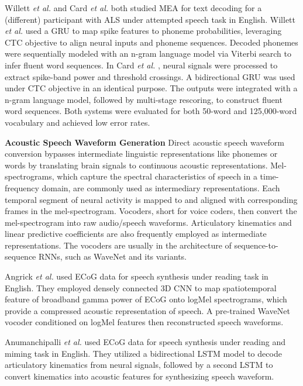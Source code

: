 \documentclass[journal]{IEEEtran}
\begin{document}
Willett \emph{et al.} \cite{Willett2023} and Card \emph{et al.} \cite{Card2024} both studied MEA for text decoding for a (different) participant with ALS under attempted speech task in English. Willett \emph{et al.} \cite{Willett2023} used a GRU to map spike features to phoneme probabilities, leveraging CTC objective to align neural inputs and phoneme sequences. Decoded phonemes were sequentially modeled with an n-gram language model via Viterbi search to infer fluent word sequences. In Card \emph{et al.} \cite{Card2024}, neural signals were processed to extract spike-band power and threshold crossings. A bidirectional GRU was used under CTC objective in an identical purpose. The outputs were integrated with a n-gram language model, followed by multi-stage rescoring, to construct fluent word sequences. Both systems were evaluated for both 50-word and 125,000-word vocabulary and achieved low error rates.

\textbf{Acoustic Speech Waveform Generation} Direct acoustic speech waveform conversion bypasses intermediate linguistic representations like phonemes or words by translating brain signals to continuous acoustic representations. Mel-spectrograms, which capture the spectral characteristics of speech in a time-frequency domain, are commonly used as intermediary representations. Each temporal segment of neural activity is mapped to and aligned with corresponding frames in the mel-spectrogram. Vocoders, short for voice coders, then convert the mel-spectrogram into raw audio/speech waveforms. Articulatory kinematics and linear predictive coefficients are also frequently employed as intermediate representations. The vocoders are usually in the architecture of sequence-to-sequence RNNs, such as WaveNet \cite{VanDenOord2016} and its variants.

Angrick \emph{et al.} \cite{Angrick2019} used ECoG data for speech synthesis under reading task in English. They employed densely connected 3D CNN \cite{Huang2017} to map spatiotemporal feature of broadband gamma power of ECoG onto logMel spectrograms, which provide a compressed acoustic representation of speech. A pre-trained WaveNet vocoder conditioned on logMel features\cite{Shen2018} then reconstructed speech waveforms.

Anumanchipalli \emph{et al.} \cite{Anumanchipalli2019} used ECoG data for speech synthesis under reading and miming task in English. They utilized a bidirectional LSTM model to decode articulatory kinematics from neural signals, followed by a second LSTM to convert kinematics into acoustic features for synthesizing speech waveform.
\end{document}
